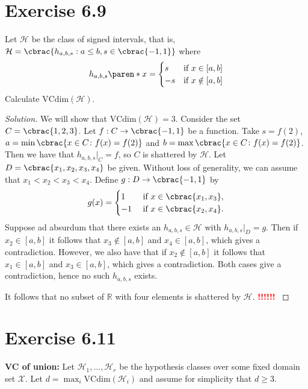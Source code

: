 \documentclass[10pt, a4paper, twoside]{amsart}
\theoremstyle{plain}
\newcommand{\R}{\ensuremath{\mathbb{R}}}
\DeclarePairedDelimiter\cbrac\{\}
\DeclarePairedDelimiter\paren()
\renewcommand{\c}{\ensuremath{\colon}}
\newcommand{\cH}{\ensuremath{\mathcal{H}}}
\newcommand{\cX}{\ensuremath{\mathcal{X}}}
\newenvironment{solution}
               {\let\oldqedsymbol=\qedsymbol
                \renewcommand{\qedsymbol}{$\blacktriangleleft$}
                \begin{proof}[Solution]}
               {\end{proof}
                \renewcommand{\qedsymbol}{\oldqedsymbol}}
\newcommand{\TODO}{\textcolor{red}{\textbf{!!!!!! }}}
\begin{document}
\section*{Exercise 6.9}
Let $\cH$ be the class of signed intervals, that is, \\
$\cH = \cbrac{h_{a,b,s}:a \leq b, s \in \cbrac{-1,1}}$ where
\begin{equation*}
  h_{a,b,s}\paren*{x} =
  \begin{cases} 
    s &\mbox{if } x \in [a,b] \\
    -s &\mbox{if } x \notin [a,b]
  \end{cases}
\end{equation*}
Calculate $\text{VCdim}(\cH)$.
 \begin{solution}
  We will show that $\mathrm{VCdim}(\cH)=3$. Consider the set $C=\cbrac{1,2,3}$. Let $f:C \to \cbrac{-1,1}$ be a function.
  Take $s = f(2)$, $a=\min\cbrac{x \in C \c f(x)=f(2)}$ and $b=\max\cbrac{x \in C \c f(x)=f(2)}$. Then we have that $h_{a,b,s}|_{C}=f$,
  so $C$ is shattered by $\cH$. Let $D=\cbrac{x_1,x_2,x_3,x_4}$ be given. Without loss of generality, we can assume that $x_1<x_2<x_3<x_4$. Define $g:D\to\cbrac{-1,1}$ by
  \begin{equation*}
   g(x)=
   \begin{cases}
    1 & \text{ if }x\in \cbrac{x_1,x_3}, \\
    -1 & \text{ if }x\in \cbrac{x_2,x_4}.
   \end{cases}
  \end{equation*}
Suppose ad absurdum that there exists an $h_{a,b,s} \in \cH$ with $h_{a,b,s}|_{D}=g$. Then if $x_2 \in [a,b]$ it follows that $x_3  \notin [a,b]$ and $x_4 \in [a,b]$, which gives a contradiction. However, we also have that if $x_2 \notin [a,b]$
it follows that $x_1  \in [a,b]$ and $x_3 \in [a,b]$, which gives a contradiction. 
Both cases give a contradiction, hence no such $h_{a,b,s}$ exists.

It follows that no subset of $\R$ with four elements is shattered by $\cH$.
\TODO
 \end{solution}
\section*{Exercise 6.11}
\textbf{VC of union:} Let $\cH_1, \ldots , \cH_r$ be the hypothesis classes over some fixed domain set $\cX$. Let $d = \max_i \text{VCdim}(\cH_i)$ and assume for simplicity that $d \geq 3$.
\end{document}
